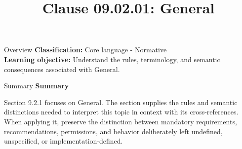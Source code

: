 \documentclass[10pt,letterpaper]{article}
\title{Clause 09.02.01: General}
\author{}
\date{}
\begin{document}
\maketitle
\begin{CornellOverviewBox}{Overview}
\textbf{Classification:} Core language - Normative\\[2pt]
\textbf{Learning objective:} Understand the rules, terminology, and semantic consequences associated with General.
\end{CornellOverviewBox}\begin{CornellSummaryBox}{Summary}
{\sffamily\bfseries\color{Accent} Summary}\par\vspace{3pt}Section 9.2.1 focuses on General. The section supplies the rules and semantic distinctions needed to interpret this topic in context with its cross-references. When applying it, preserve the distinction between mandatory requirements, recommendations, permissions, and behavior deliberately left undefined, unspecified, or implementation-defined.
\end{CornellSummaryBox}
\end{document}
